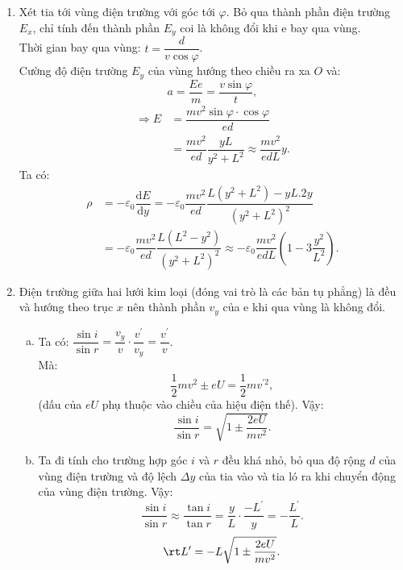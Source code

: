 \begin{loigiai}
\begin{enumerate}[1)]
    \item Xét tia tới vùng điện trường với góc tới $\varphi$. Bỏ qua thành phần điện trường ${E}_{{x}}$, chỉ tính đến thành phần ${E}_{{y}}$ coi là không đổi khi e bay qua vùng.\\
Thời gian bay qua vùng: $t=\dfrac{d}{v \cos \varphi}$.\\
Cường độ điện trường ${E}_{{y}}$ của vùng hướng theo chiều ra xa ${O}$ và:
\[a=\dfrac{E e}{m}=\dfrac{v \sin \varphi}{t},\]
\[\begin{aligned} 
\Rightarrow E&=\dfrac{m v^{2} \sin \varphi \cdot \cos \varphi}{e d}\\
&=\dfrac{m v^{2}}{e d} \dfrac{y L}{y^{2}+L^{2}} \approx \dfrac{m v^{2}}{e d L} y.
\end{aligned}\]
Ta có:
\begin{align*}
\rho&=-\varepsilon_0\dfrac{\mathrm{d} E}{\mathrm{d} y}=-\varepsilon_0\dfrac{m v^{2}}{e d} \dfrac{L\left(y^{2}+L^{2}\right)-y L .2 y}{\left(y^{2}+L^{2}\right)^{2}}\\
&=-\varepsilon_0\dfrac{m v^{2}}{e d} \dfrac{L\left(L^{2}-y^{2}\right)}{\left(y^{2}+L^{2}\right)^{2}} \approx-\varepsilon_0\dfrac{m v^{2}}{e d L}\left(1-3 \dfrac{y^{2}}{L^{2}}\right).
\end{align*}
\item Điện trường giữa hai lưới kim loại (đóng vai trò là các bản tụ phẳng) là đều và hướng theo trục $x$ nên thành phần $v_{y}$ của e khi qua vùng là không đổi. 
\begin{enumerate}[a)]
    \item Ta có: $\dfrac{\sin i}{\sin r}=\dfrac{v_{y}}{v} \cdot \dfrac{v^{\prime}}{v_{y}}=\dfrac{v^{\prime}}{v}$.\\
Mà: 
\[\dfrac{1}{2} m v^{2} \pm e U=\dfrac{1}{2} m v^{\prime 2},\] 
(dấu của $eU$ phụ thuộc vào chiều của hiệu điện thế). Vậy:
\[
\dfrac{\sin i}{\sin r}=\sqrt{1 \pm \dfrac{2 e U}{m v^{2}}}.
\]
\item Ta đi tính cho trường hợp góc ${i}$ và ${r}$ đều khá nhỏ, bỏ qua độ rộng ${d}$ của vùng điện trường và độ lệch $\Delta {y}$ của tia vào và tia ló ra khi chuyển động của vùng điện trường.
Vậy:
\[\dfrac{\sin i}{\sin r} \approx \dfrac{\tan i}{\tan r}=\dfrac{y}{L} \cdot \dfrac{-L^{\prime}}{y}=-\dfrac{L^{\prime}}{L}.\]
\[\rt L^{\prime}=-L \sqrt{1 \pm \dfrac{2 e U}{m v^{2}}}.\]
\end{enumerate} 
\end{enumerate}
\end{loigiai}

